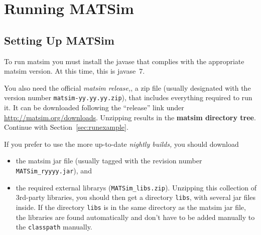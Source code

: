 
\section{Running MATSim}
\label{sec:runningmatsim}

\subsection{Setting Up MATSim}
\label{sec:settingUpMatsim}

To run \gls{matsim} you must install the \gls{javase} that complies with the appropriate \gls{matsim} version. At this time, this is \gls{javase}~7.

You also need the official \emph{\gls{matsim} release,}, a zip file (usually designated with the version number \lstinline|matsim-yy.yy.yy.zip|), that includes everything required to run it. It can be downloaded following the ``release'' link under \url{http://matsim.org/downloads}.
Unzipping results in the \textbf{\gls{matsim} directory tree}. Continue with Section~\ref{sec:runexample}.

If you prefer to use the more up-to-date \emph{nightly builds,} you should download
\begin{itemize}\styleItemize
\item the \gls{matsim} \gls{jar} file (usually tagged with the revision number \lstinline|MATSim_ryyyy.jar|), and
\item the required external \glspl{library} (\lstinline|MATSim_libs.zip|). 
Unzipping this collection of 3rd-party libraries, you should then get a directory \lstinline|libs|, with several \gls{jar} files inside. If the directory \lstinline|libs| is in the same directory as the \gls{matsim} \gls{jar} file, the libraries are found automatically and don't have to be added manually to the \lstinline|classpath| manually.
\end{itemize}

